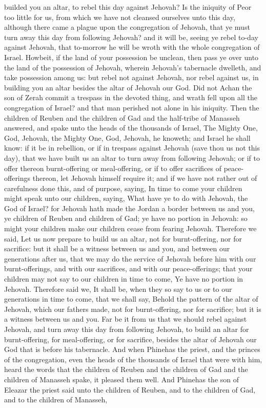builded you an altar, to rebel this day against Jehovah? Is the iniquity of Peor too little for us, from which we have not cleansed ourselves unto this day, although there came a plague upon the congregation of Jehovah, that ye must turn away this day from following Jehovah? and it will be, seeing ye rebel to-day against Jehovah, that to-morrow he will be wroth with the whole congregation of Israel. Howbeit, if the land of your possession be unclean, then pass ye over unto the land of the possession of Jehovah, wherein Jehovah’s tabernacle dwelleth, and take possession among us: but rebel not against Jehovah, nor rebel against us, in building you an altar besides the altar of Jehovah our God. Did not Achan the son of Zerah commit a trespass in the devoted thing, and wrath fell upon all the congregation of Israel? and that man perished not alone in his iniquity.  Then the children of Reuben and the children of Gad and the half-tribe of Manasseh answered, and spake unto the heads of the thousands of Israel, The Mighty One, God, Jehovah, the Mighty One, God, Jehovah, he knoweth; and Israel he shall know: if it be in rebellion, or if in trespass against Jehovah (save thou us not this day), that we have built us an altar to turn away from following Jehovah; or if to offer thereon burnt-offering or meal-offering, or if to offer sacrifices of peace-offerings thereon, let Jehovah himself require it; and if we have not rather out of carefulness done this, and of purpose, saying, In time to come your children might speak unto our children, saying, What have ye to do with Jehovah, the God of Israel? for Jehovah hath made the Jordan a border between us and you, ye children of Reuben and children of Gad; ye have no portion in Jehovah: so might your children make our children cease from fearing Jehovah. Therefore we said, Let us now prepare to build us an altar, not for burnt-offering, nor for sacrifice: but it shall be a witness between us and you, and between our generations after us, that we may do the service of Jehovah before him with our burnt-offerings, and with our sacrifices, and with our peace-offerings; that your children may not say to our children in time to come, Ye have no portion in Jehovah. Therefore said we, It shall be, when they so say to us or to our generations in time to come, that we shall say, Behold the pattern of the altar of Jehovah, which our fathers made, not for burnt-offering, nor for sacrifice; but it is a witness between us and you. Far be it from us that we should rebel against Jehovah, and turn away this day from following Jehovah, to build an altar for burnt-offering, for meal-offering, or for sacrifice, besides the altar of Jehovah our God that is before his tabernacle.  And when Phinehas the priest, and the princes of the congregation, even the heads of the thousands of Israel that were with him, heard the words that the children of Reuben and the children of Gad and the children of Manasseh spake, it pleased them well. And Phinehas the son of Eleazar the priest said unto the children of Reuben, and to the children of Gad, and to the children of Manasseh, 
